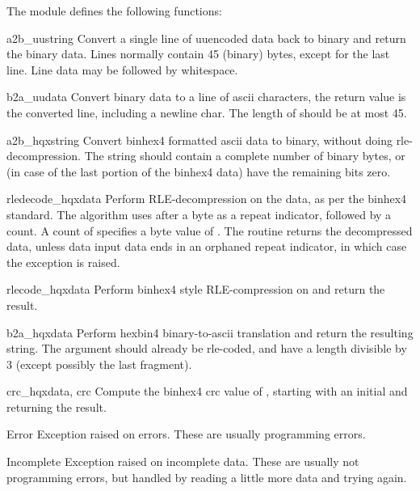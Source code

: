 The  module defines the following functions:

\renewcommand{\indexsubitem}{(in module binascii)}

\begin{funcdesc}{a2b_uu}{string}
Convert a single line of uuencoded data back to binary and return the
binary data. Lines normally contain 45 (binary) bytes, except for the
last line. Line data may be followed by whitespace.
\end{funcdesc}

\begin{funcdesc}{b2a_uu}{data}
Convert binary data to a line of ascii characters, the return value is
the converted line, including a newline char. The length of 
should be at most 45.
\end{funcdesc}

\begin{funcdesc}{a2b_hqx}{string}
Convert binhex4 formatted ascii data to binary, without doing
rle-decompression. The string should contain a complete number of
binary bytes, or (in case of the last portion of the binhex4 data)
have the remaining bits zero.
\end{funcdesc}

\begin{funcdesc}{rledecode_hqx}{data}
Perform RLE-decompression on the data, as per the binhex4
standard. The algorithm uses  after a byte as a repeat
indicator, followed by a count. A count of  specifies a byte
value of . The routine returns the decompressed data,
unless data input data ends in an orphaned repeat indicator, in which
case the  exception is raised.
\end{funcdesc}

\begin{funcdesc}{rlecode_hqx}{data}
Perform binhex4 style RLE-compression on  and return the
result.
\end{funcdesc}

\begin{funcdesc}{b2a_hqx}{data}
Perform hexbin4 binary-to-ascii translation and return the resulting
string. The argument should already be rle-coded, and have a length
divisible by 3 (except possibly the last fragment).
\end{funcdesc}

\begin{funcdesc}{crc_hqx}{data, crc}
Compute the binhex4 crc value of , starting with an initial
 and returning the result.
\end{funcdesc}
 
\begin{excdesc}{Error}
Exception raised on errors. These are usually programming errors.
\end{excdesc}

\begin{excdesc}{Incomplete}
Exception raised on incomplete data. These are usually not programming
errors, but handled by reading a little more data and trying again.
\end{excdesc}
